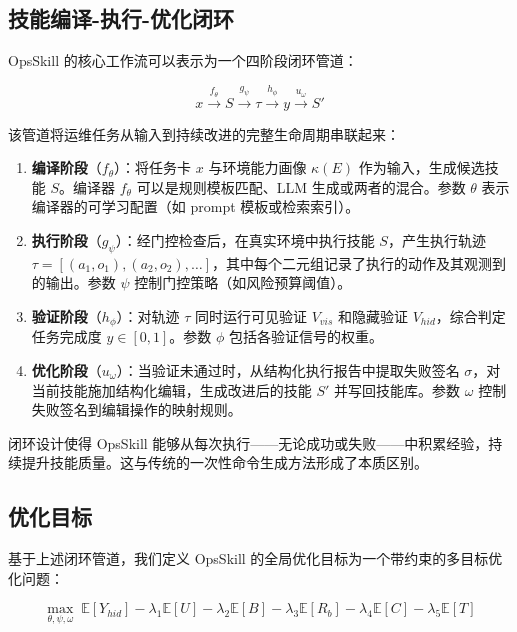 \documentclass[11pt,a4paper]{ctexart}
\begin{document}
\subsection{技能编译-执行-优化闭环}

OpsSkill 的核心工作流可以表示为一个四阶段闭环管道：

\begin{equation}
x \xrightarrow{f_\theta} S \xrightarrow{g_\psi} \tau \xrightarrow{h_\phi} y \xrightarrow{u_\omega} S'
\end{equation}

\noindent 该管道将运维任务从输入到持续改进的完整生命周期串联起来：
\begin{enumerate}[leftmargin=2em]
  \item \textbf{编译阶段}（$f_\theta$）：将任务卡 $x$ 与环境能力画像 $\kappa(E)$ 作为输入，生成候选技能 $S$。编译器 $f_\theta$ 可以是规则模板匹配、LLM 生成或两者的混合。参数 $\theta$ 表示编译器的可学习配置（如 prompt 模板或检索索引）。
  \item \textbf{执行阶段}（$g_\psi$）：经门控检查后，在真实环境中执行技能 $S$，产生执行轨迹 $\tau = [(a_1, o_1), (a_2, o_2), \ldots]$，其中每个二元组记录了执行的动作及其观测到的输出。参数 $\psi$ 控制门控策略（如风险预算阈值）。
  \item \textbf{验证阶段}（$h_\phi$）：对轨迹 $\tau$ 同时运行可见验证 $V_{vis}$ 和隐藏验证 $V_{hid}$，综合判定任务完成度 $y \in [0, 1]$。参数 $\phi$ 包括各验证信号的权重。
  \item \textbf{优化阶段}（$u_\omega$）：当验证未通过时，从结构化执行报告中提取失败签名 $\sigma$，对当前技能施加结构化编辑，生成改进后的技能 $S'$ 并写回技能库。参数 $\omega$ 控制失败签名到编辑操作的映射规则。
\end{enumerate}

\noindent 闭环设计使得 OpsSkill 能够从每次执行——无论成功或失败——中积累经验，持续提升技能质量。这与传统的一次性命令生成方法形成了本质区别。

\subsection{优化目标}

基于上述闭环管道，我们定义 OpsSkill 的全局优化目标为一个带约束的多目标优化问题：

\begin{equation}
\max_{\theta,\psi,\omega} \; \mathbb{E}[Y_{hid}] - \lambda_1 \mathbb{E}[U] - \lambda_2 \mathbb{E}[B] - \lambda_3 \mathbb{E}[R_b] - \lambda_4 \mathbb{E}[C] - \lambda_5 \mathbb{E}[T]
\end{equation}
\end{document}
